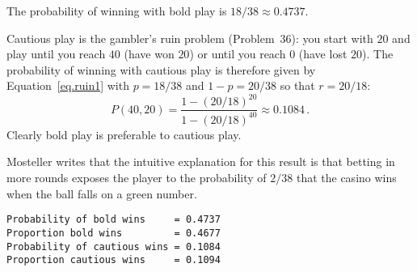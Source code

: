 \solution{}

The probability of winning with bold play is $18/38\approx 0.4737$.

Cautious play is the gambler's ruin problem (Problem~36): you start with $20$ and play until you reach $40$ (have won $20$) or until you reach $0$ (have lost $20$). The probability of winning with cautious play is therefore given by Equation~\ref{eq.ruin1} with $p=18/38$ and $1-p=20/38$ so that $r=20/18$:
\[
P(40,20) =
\frac{1-(20/18)^{20}}{1-(20/18)^{40}}\approx 0.1084\,.
\]
Clearly bold play is preferable to cautious play.

Mosteller writes that the intuitive explanation for this result is that betting in more rounds exposes the player to the probability of $2/38$ that the casino wins when the ball falls on a green number.

\sml{}
\begin{verbatim}
Probability of bold wins     = 0.4737
Proportion bold wins         = 0.4677
Probability of cautious wins = 0.1084
Proportion cautious wins     = 0.1094
\end{verbatim}




